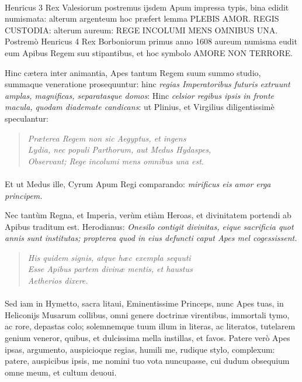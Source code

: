 \documentclass[a4paper, 11pt, oneside, polutonikogreek, latin]{article}
\begin{document}
\paragraph{}
Henricus 3 Rex Valesiorum postremus ijsdem Apum impressa typis, bina edidit numismata: alterum argenteum hoc præfert lemma PLEBIS AMOR. REGIS CUSTODIA: alterum aureum: REGE INCOLUMI MENS OMNIBUS UNA. Postremò Henricus 4 Rex Borboniorum primus anno 1608 aureum numisma eudit eum Apibus Regem suu stipantibus, et hoc symbolo AMORE NON TERRORE.

Hinc cætera inter animantia, Apes tantum Regem suum summo studio, summaque veneratione prosequuntur: hinc \emph{regias Imperatoribus futuris extruunt amplas, magnificas, separatasque domos}: Hinc \emph{celsior regibus ipsis in fronte macula, quodam diademate candicans}: ut Plinius, et Virgilius diligentissimè speculantur:
\begin{quote}
\emph{Præterea Regem non sic Aegyptus, et ingens}\\
\emph{Lydia, nec populi Parthorum, aut Medus Hydaspes,}\\
\emph{Observant; Rege incolumi mens omnibus una est.}\\
\end{quote}
\vspace*{-8mm}
\paragraph{}
Et ut Medus ille, Cyrum Apum Regi comparando: \emph{mirificus eis amor erga principem.}

Nec tantùm Regna, et Imperia, verùm etiàm Heroas, et divinitatem portendi ab Apibus traditum est. Herodianus: \emph{Onesilo contigit divinitas, eique sacrificia quot annis sunt institutas; propterea quod in eius defuncti caput Apes mel cogessissent.}
\begin{quote}
\emph{His quidem signis, atque hæc exempla sequuti}\\
\emph{Esse Apibus partem divinæ mentis, et haustus}\\
\emph{Aetherios dixere.}\\
\end{quote}
\vspace*{-8mm}
\paragraph{}
Sed iam in Hymetto, sacra litaui, Eminentissime Princeps, nunc Apes tuas, in Heliconijs Musarum collibus, omni genere doctrinæ virentibus, immortali tymo, ac rore, depastas colo; solemnemque tuum illum in literas, ac literatos, tutelarem genium veneror, quibus, et dulcissima mella instillas, et favos. Patere verò Apes ipsas, argumento, auspicioque regias, humili me, rudique stylo, complexum: patere, auspicibus ipsis, me nomini tuo vota nuncupasse, cui dudum obsequium omne meum, et cultum deuoui.
\end{document}
